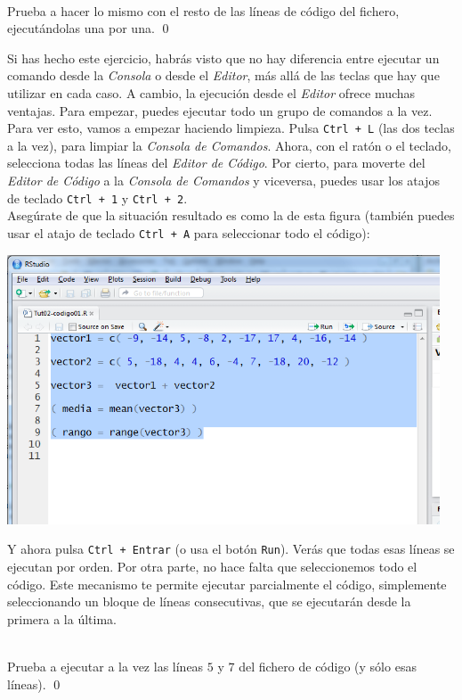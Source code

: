\documentclass[10pt,a4paper]{article}\usepackage[]{graphicx}\usepackage[]{color}
\begin{document}
\begin{ejercicio}
\label{tut02:ejercicio19}
\quad\\
Prueba a hacer lo mismo con el resto de las líneas de código del fichero, ejecutándolas una por una.
\qed
\end{ejercicio}
Si has hecho este ejercicio, habrás visto que no hay diferencia entre ejecutar un comando desde la {\em Consola} o desde el {\em Editor}, más allá de las teclas que hay que utilizar en cada caso. A cambio, la ejecución desde el {\em Editor} ofrece muchas ventajas. Para empezar, puedes ejecutar todo un grupo de comandos a la vez. Para ver esto, vamos a empezar haciendo limpieza. Pulsa {\tt Ctrl + L} (las dos teclas a la vez), para limpiar la {\em Consola de Comandos}. Ahora, con el ratón o el teclado, selecciona todas las líneas del {\em Editor de Código}. Por cierto, para moverte del {\em Editor de Código} a la {\em Consola de Comandos} y viceversa, puedes usar los atajos de teclado {\tt Ctrl + 1} y {\tt Ctrl + 2}.\\

Asegúrate de que la situación resultado es como la de esta figura (también puedes usar el atajo de teclado {\tt Ctrl + A} para seleccionar todo el código):
    \begin{center}
    \includegraphics[height=8cm]{../fig/Tut02-22.png}
    \end{center}
Y ahora pulsa {\tt Ctrl + Entrar} (o usa el botón {\tt Run}). Verás que todas esas líneas se ejecutan por orden. Por otra parte, no hace falta que seleccionemos todo el código. Este mecanismo te permite ejecutar parcialmente el código, simplemente seleccionando un bloque de líneas consecutivas, que se ejecutarán desde la primera a la última.
\begin{ejercicio}
\label{tut02:ejercicio20}
\quad\\
Prueba a ejecutar a la vez las líneas $5$ y $7$ del fichero de código (y sólo esas líneas).
\qed
\end{ejercicio}
\end{document}

